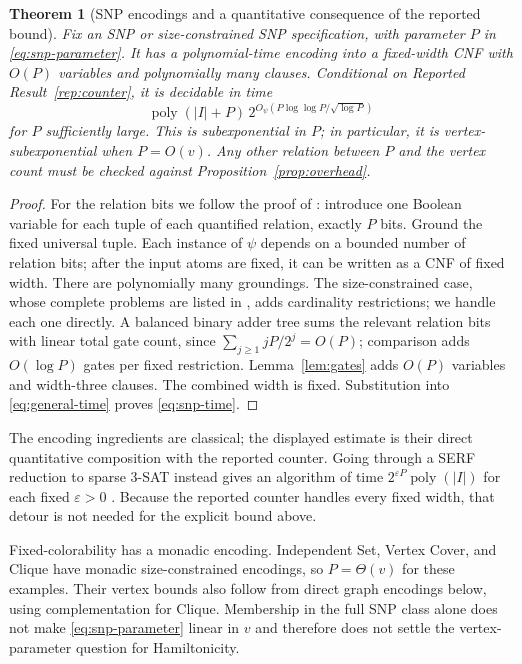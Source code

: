 \documentclass[11pt,reqno]{amsart}
\numberwithin{equation}{section}
\theoremstyle{plain}
\newtheorem{theorem}{Theorem}[section]
\theoremstyle{definition}
\theoremstyle{remark}
\newcommand{\poly}{\operatorname{poly}}
\begin{document}
\begin{theorem}[SNP encodings and a quantitative consequence of the reported bound]
\label{thm:snp}
Fix an SNP or size-constrained SNP specification, with parameter $P$ in
\eqref{eq:snp-parameter}. It has a polynomial-time encoding into a
fixed-width CNF with $O(P)$ variables and polynomially many clauses.
Conditional on Reported Result~\ref{rep:counter}, it is decidable in time
\begin{equation}\label{eq:snp-time}
 \poly(|I|+P)\,2^{O_\psi(P\log\log P/\sqrt{\log P})}
\end{equation}
for $P$ sufficiently large. This is subexponential in $P$; in particular,
it is vertex-subexponential when $P=O(v)$. Any other relation between $P$
and the vertex count must be checked against
Proposition~\ref{prop:overhead}.
\end{theorem}
\begin{proof}
For the relation bits we follow the proof of \cite[Theorem~2]{IPZ}:
introduce one Boolean variable for each tuple of each quantified relation,
exactly $P$ bits. Ground the
fixed universal tuple. Each instance of $\psi$ depends on a bounded number
of relation bits; after the input atoms are fixed, it can be written as a
CNF of fixed width. There are polynomially many groundings.
The size-constrained case, whose complete problems are listed in
\cite[Theorem~5]{IPZ}, adds cardinality restrictions; we handle each one
directly. A balanced binary adder tree sums the
relevant relation bits with linear total gate count, since
$\sum_{j\ge1}jP/2^j=O(P)$; comparison adds $O(\log P)$ gates per fixed
restriction. Lemma~\ref{lem:gates} adds $O(P)$ variables and width-three
clauses. The combined width is fixed. Substitution into
\eqref{eq:general-time} proves \eqref{eq:snp-time}.
\end{proof}
The encoding ingredients are classical; the displayed estimate is their
direct quantitative composition with the reported counter. Going through
a SERF reduction to sparse 3-SAT instead gives an algorithm of time
$2^{\varepsilon P}\poly(|I|)$ for each fixed $\varepsilon>0$ \cite{IPZ}.
Because the reported counter handles every fixed width, that detour is not
needed for the explicit bound above.

Fixed-colorability has a monadic encoding. Independent Set, Vertex Cover,
and Clique have monadic size-constrained encodings, so $P=\Theta(v)$ for
these examples. Their vertex bounds also follow from direct graph
encodings below, using complementation for Clique. Membership in the full
SNP class alone does not make \eqref{eq:snp-parameter} linear in $v$ and
therefore does not settle the vertex-parameter question for Hamiltonicity.
\end{document}
